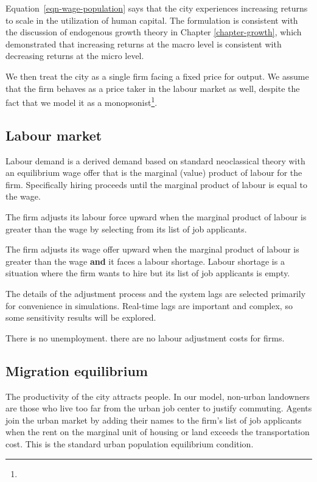 Equation~\ref{eqn-wage-population} says that the city experiences increasing returns to scale in the utilization of human capital. The formulation is  consistent with the discussion of endogenous growth theory in Chapter \ref{chapter-growth}, which demonstrated that increasing returns at the macro level is consistent with decreasing returns at the micro level. 

We then treat the city as a single firm facing a fixed price for output. We assume that the firm behaves as a price taker in the labour market as well, despite  the fact that we  model it as a \gls{monopsonist}\footnote{}.

\subsection{Labour market}
Labour demand is a derived demand based on standard neoclassical theory with an equilibrium wage offer that is the marginal (value) product of labour for the firm. Specifically  hiring proceeds until the marginal product of labour  is equal to the wage.

The firm adjusts its labour force upward when the marginal product of labour is greater than the wage by selecting from its list of job applicants.

The firm adjusts its wage offer upward when the marginal product of labour is greater than the wage \textbf{and} it faces a labour shortage.  Labour shortage is a situation where the firm wants to hire but its list of job applicants is empty.

{\color{red}The details of the adjustment process and the system lags are selected primarily for convenience in simulations. Real-time lags are important and complex, so some sensitivity results will be explored.}

There is no unemployment. there are no labour adjustment costs for firms.

\subsection{Migration equilibrium}
The  productivity of the city attracts people.  In our model, non-urban landowners are those who live too far from the urban job center to justify commuting.  Agents join the urban market by adding their names to the firm's list of job applicants when the rent  on the marginal unit of housing or land exceeds the transportation cost. This is the  standard urban population equilibrium condition. 
   

